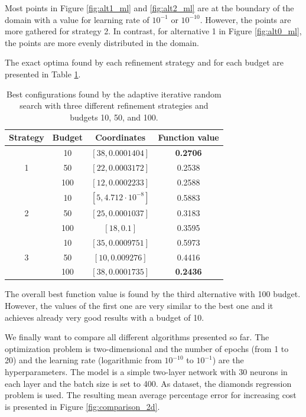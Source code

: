 Most points in Figure \ref{fig:alt1_ml} and \ref{fig:alt2_ml} are at the boundary of the domain with a value for learning rate of $ 10^{-1} $ or $ 10^{-10} $. However, the points are more gathered for strategy 2. In contrast, for alternative 1 in Figure \ref{fig:alt0_ml}, the points are more evenly distributed in the domain. \newline 

The exact optima found by each refinement strategy and for each budget are presented in Table \ref{tab:results_alternatives_ml}.


\begin{table}[H]
	\caption{ Best configurations found by the adaptive iterative random search with three different refinement strategies and budgets 10, 50, and 100. }
	\label{tab:results_alternatives_ml}
	\centering
	\begin{tabular}{| c |  c |c c |} 
		\hline
		Strategy & Budget & Coordinates & Function value \\ 
		\hline
		
		& 10 & $ [38, 0.0001404]$ & \textbf{0.2706} \\ 
		1 & 50 & $[22, 0.0003172]$ & 0.2538 \\ 
		& 100 & $[12, 0.0002233]$ & 0.2588 \\ 
		\hline
		& 10 & $ [5, 4.712\cdot 10^{-8}] $ & 0.5883 \\ 
		2 & 50 & $[25, 0.0001037]$ & 0.3183 \\ 
		& 100 & $[18, 0.1]$ & 0.3595 \\ 
		\hline
		& 10 & $ [35, 0.0009751] $ & 0.5973 \\ 
		3 & 50 & $[10, 0.009276]$ & 0.4416 \\ 
		& 100 &$ [38, 0.0001735] $& \textbf{0.2436} \\ 
		
		\hline
	\end{tabular}
\end{table}

The overall best function value is found by the third alternative with 100 budget. However, the values of the first one are very similar to the best one and it achieves already very good results with a budget of 10. \newline 

We finally want to compare all different algorithms presented so far. The optimization problem is two-dimensional and the number of epochs (from 1 to 20) and the learning rate (logarithmic from $ 10^{-10} $ to $ 10^{-1} $) are the hyperparameters. The model is a simple two-layer network with 30 neurons in each layer and the batch size is set to 400. As dataset, the diamonds regression problem is used. The resulting mean average percentage error for increasing cost is presented in Figure \ref{fig:comparison_2d}.

